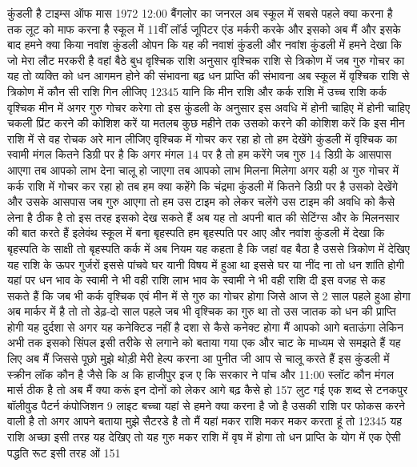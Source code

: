 कुंडली है टाइम्स ऑफ मास 1972 12:00 बैंगलोर का जनरल अब स्कूल में सबसे पहले
क्या करना है तक लूट को माफ करना है स्कूल में 11वीं लॉर्ड जूपिटर एंड मर्करी करके
और इसको अब मैं और इसके बाद हमने क्या किया नवांश कुंडली
ओपन कि यह की नवाशं कुंडली और नवांश कुंडली में हमने देखा कि जो मेरा लौट
मरकरी है वहां बैठे बुध वृश्चिक राशि
अनुसार वृश्चिक राशि से त्रिकोण में जब गुरु गोचर का यह तो व्यक्ति को धन आगमन
होने की संभावना बढ़ धन प्राप्ति की संभावना अब स्कूल में वृश्चिक राशि से
त्रिकोण में कौन सी राशि गिन लीजिए 12345 यानि कि मीन राशि और कर्क राशि में उच्च
राशि कर्क वृश्चिक मीन में अगर गुरु गोचर करेगा तो इस कुंडली के अनुसार इस अवधि में
होनी चाहिए में होनी चाहिए चकली प्रिंट करने की कोशिश करें या मतलब कुछ महीने तक
उसको करने की कोशिश करें कि इस मीन राशि में से वह रोचक अरे मान लीजिए वृश्चिक में गोचर कर रहा हो तो हम देखेंगे
कुंडली में वृश्चिक का स्वामी मंगल कितने डिग्री पर है कि अगर मंगल 14 पर है तो हम करेंगे जब
गुरु 14 डिग्री के आसपास आएगा तब आपको लाभ देना चालू हो जाएगा तब आपको लाभ मिलना
मिलेगा अगर यही अ गुरु गोचर में कर्क राशि में गोचर कर रहा हो तब हम क्या कहेंगे कि
चंद्रमा कुंडली में कितने डिग्री पर है उसको देखेंगे और उसके आसपास जब गुरु आएगा तो हम उस टाइम को लेकर चलेंगे उस टाइम की
अवधि को कैसे लेना है ठीक है तो इस तरह इसको देख सकते हैं अब यह तो अपनी बात की सेटिंग्स और के मिलनसार की बात करते हैं
इलेवंथ स्कूल में बना बृहस्पति हम बृहस्पति पर आए और नवांश कुंडली में देखा कि बृहस्पति के साक्षी तो बृहस्पति कर्क
में अब नियम यह कहता है कि जहां वह बैठा है उससे त्रिकोण में देखिए यह राशि के ऊपर
गुर्जरों इससे पांचवे घर यानी विषय में हुआ था इससे घर या नींद ना तो धन
शांति होगी यहां पर धन भाव के स्वामी ने भी वही राशि लाभ भाव के स्वामी ने भी वही
राशि दी इस वजह से कह सकते हैं कि जब भी कर्क वृश्चिक एवं मीन में से गुरु का गोचर होगा जिसे आज से 2 साल पहले हुआ होगा अब
मार्कर में है तो तो डेढ़-दो साल पहले जब भी वृश्चिक का गुरु था तो उस जातक को धन की प्राप्ति होगी यह दुर्दशा से अगर यह
कनेक्टिड नहीं है दशा से कैसे कनेक्ट होगा मैं आपको आगे बताऊंगा लेकिन अभी तक इसको सिंपल इसी तरीके से लगाने को बताया गया एक
और चाट के माध्यम से समझते हैं यह लिए अब मैं जिससे पूछो मुझे थोड़ी मेरी हेल्प
करना आ पुनीत जी आप से चालू करते हैं इस कुंडली में स्क्रीन लॉक कौन है जैसे कि अ
कि हाजीपुर इज ए कि सरकार ने पांच और 11:00 स्लॉट कौन मंगल
मार्स ठीक है तो अब मैं क्या करूं इन दोनों को लेकर आगे बढ़ कैसे हो
157 लुट गई एक शब्द से टनकपुर बॉलीवुड पैटर्न
कंपोजिशन 9 लाइट बच्चा यहां से हमने क्या
करना है जो है उसकी राशि पर फोकस करने
वाली है तो अगर आपने बताया मुझे सैटरडे है
तो मैं यहां मकर राशि मकर मकर करता हूं तो
12345 यह राशि अच्छा इसी तरह यह देखिए तो
यह गुरु मकर राशि में वृष में होगा तो धन
प्राप्ति के योग में एक ऐसी पद्धति रूट इसी तरह ओं 151

